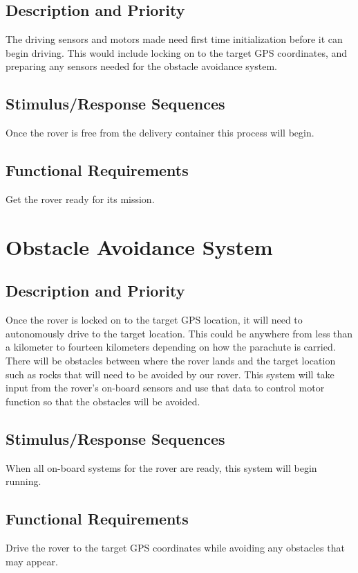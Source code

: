 \documentclass{scrreprt}
\begin{document}
\subsection{Description and Priority}
	The driving sensors and motors made need first time initialization before it can begin driving. This would include locking on to the target GPS coordinates, and preparing any sensors needed for the obstacle avoidance system.


\subsection{Stimulus/Response Sequences}
Once the rover is free from the delivery container this process will begin.

\subsection{Functional Requirements}
Get the rover ready for its mission.
\section{Obstacle Avoidance System}

\subsection{Description and Priority}
	Once the rover is locked on to the target GPS location, it will need to autonomously drive to the target location. This could be anywhere from less than a kilometer to fourteen kilometers depending on how the parachute is carried. There will be obstacles between where the rover lands and the target location such as rocks that will need to be avoided by our rover. This system will take input from the rover's on-board sensors and use that data to control motor function so that the obstacles will be avoided.


\subsection{Stimulus/Response Sequences}
When all on-board systems for the rover are ready, this system will begin running.

\subsection{Functional Requirements}
Drive the rover to the target GPS coordinates while avoiding any obstacles that may appear.
\end{document}
